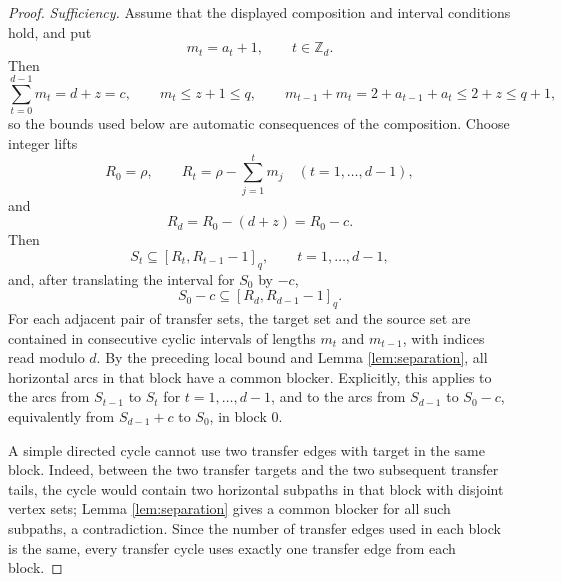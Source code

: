 \documentclass[10pt,a4paper]{amsart}
\begin{document}
\begin{proof}
\noindent\emph{Sufficiency.}
Assume that the displayed composition and interval conditions hold, and put
\[
        m_t=a_t+1,
        \qquad t\in\mathbb Z_d.
\]
Then
\[
        \sum_{t=0}^{d-1}m_t=d+z=c,
        \qquad
        m_t\le z+1\le q,
        \qquad
        m_{t-1}+m_t=2+a_{t-1}+a_t\le 2+z\le q+1,
\]
so the bounds used below are automatic consequences of the composition. Choose integer lifts
\[
        R_0=\rho,
        \qquad
        R_t=\rho-\sum_{j=1}^t m_j\quad (t=1,\ldots,d-1),
\]
and
\[
        R_d=R_0-(d+z)=R_0-c .
\]
Then
\begin{equation}
        S_t\subseteq [R_t,R_{t-1}-1]_q,
        \qquad t=1,\ldots,d-1,
        \label{eq:suff-incl1}
\end{equation}
and, after translating the interval for $S_0$ by $-c$,
\begin{equation}
        S_0-c\subseteq [R_d,R_{d-1}-1]_q .
        \label{eq:suff-incl0}
\end{equation}
For each adjacent pair of transfer sets, the target set and the source set are contained in consecutive cyclic intervals of lengths $m_t$ and $m_{t-1}$, with indices read modulo $d$. By the preceding local bound and Lemma \ref{lem:separation}, all horizontal arcs in that block have a common blocker. Explicitly, this applies to the arcs from $S_{t-1}$ to $S_t$ for $t=1,\ldots,d-1$, and to the arcs from $S_{d-1}$ to $S_0-c$, equivalently from $S_{d-1}+c$ to $S_0$, in block $0$.

A simple directed cycle cannot use two transfer edges with target in the
same block.  Indeed, between the two transfer targets and the two subsequent
transfer tails, the cycle would contain two horizontal subpaths in that
block with disjoint vertex sets; Lemma \ref{lem:separation} gives a common
blocker for all such subpaths, a contradiction.  Since the number of
transfer edges used in each block is the same, every transfer cycle uses
exactly one transfer edge from each block.


\end{proof}
\end{document}
